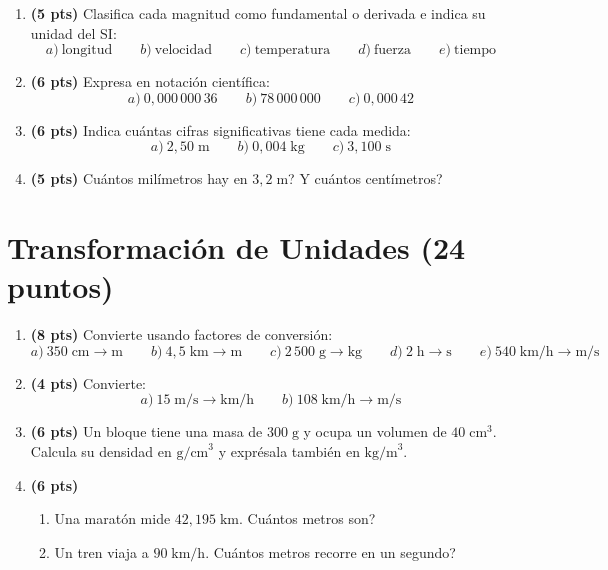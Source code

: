 \documentclass[12pt, letterpaper]{article}
\begin{document}
\begin{enumerate}[leftmargin=*]
  \item \textbf{(5 pts)} Clasifica cada magnitud como fundamental o derivada e indica su unidad del SI:
        \[
          a)\ \text{longitud} \qquad b)\ \text{velocidad} \qquad c)\ \text{temperatura} \qquad d)\ \text{fuerza} \qquad e)\ \text{tiempo}
        \]

  \item \textbf{(6 pts)} Expresa en notación científica:
        \[
          a)\ 0{,}000\,000\,36 \qquad b)\ 78\,000\,000 \qquad c)\ 0{,}000\,42
        \]

  \item \textbf{(6 pts)} Indica cuántas cifras significativas tiene cada medida:
        \[
          a)\ 2{,}50\;\text{m} \qquad b)\ 0{,}004\;\text{kg} \qquad c)\ 3{,}100\;\text{s}
        \]

  \item \textbf{(5 pts)} \textquestiondown Cuántos milímetros hay en $3{,}2\;\text{m}$? \textquestiondown Y cuántos centímetros?
\end{enumerate}

\newpage

\section{Transformación de Unidades (24 puntos)}

\begin{enumerate}[leftmargin=*]
  \item \textbf{(8 pts)} Convierte usando factores de conversión:
        \[
          a)\ 350\;\text{cm} \to \text{m} \qquad b)\ 4{,}5\;\text{km} \to \text{m} \qquad c)\ 2\,500\;\text{g} \to \text{kg} \qquad d)\ 2\;\text{h} \to \text{s} \qquad e)\ 540\;\text{km/h} \to \text{m/s}
        \]

  \item \textbf{(4 pts)} Convierte:
        \[
          a)\ 15\;\text{m/s} \to \text{km/h} \qquad b)\ 108\;\text{km/h} \to \text{m/s}
        \]

  \item \textbf{(6 pts)} Un bloque tiene una masa de $300\;\text{g}$ y ocupa un volumen de $40\;\text{cm}^3$. Calcula su densidad en $\text{g/cm}^3$ y exprésala también en $\text{kg/m}^3$.

  \item \textbf{(6 pts)}
        \begin{enumerate}[label=\alph*)]
          \item Una maratón mide $42{,}195\;\text{km}$. \textquestiondown Cuántos metros son?
          \item Un tren viaja a $90\;\text{km/h}$. \textquestiondown Cuántos metros recorre en un segundo?
        \end{enumerate}
\end{enumerate}
\end{document}

